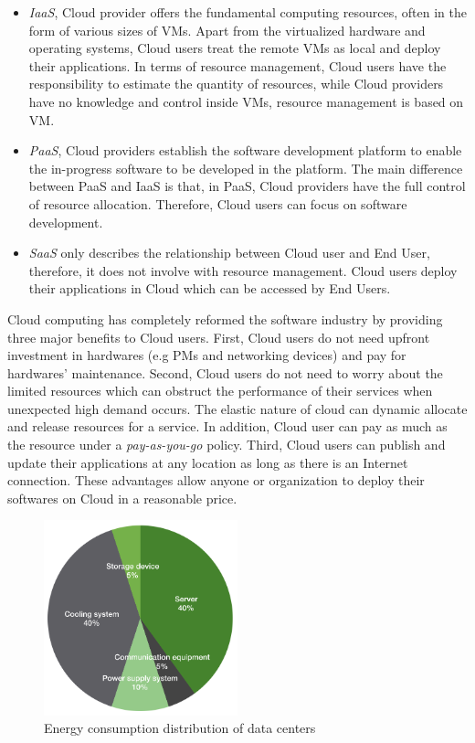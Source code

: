 \begin{itemize}
 	\item \emph{IaaS}, Cloud provider offers the fundamental computing resources, often in the form of various sizes of VMs. Apart from the virtualized hardware and operating systems, Cloud users treat the remote VMs as local and deploy their applications. In terms of resource management, Cloud users have the responsibility to estimate the quantity of resources, while Cloud providers have no knowledge and control inside VMs, resource management is based on VM. 
  	
  	\item \emph{PaaS}, Cloud providers establish the software development platform to enable the in-progress software to be developed in the platform.  The main difference between PaaS and IaaS is that, in PaaS, Cloud providers have the full control of resource allocation. Therefore, Cloud users can focus on software development.
  	
  	\item \emph{SaaS} only describes the relationship between Cloud user and End User, therefore, it does not involve with resource management. Cloud users deploy their applications in Cloud which can be accessed by End Users. 
\end{itemize}

Cloud computing has completely reformed the software industry \cite{Buyya:2009ix} by providing three major benefits to Cloud users.
First, Cloud users do not need upfront investment in hardwares (e.g PMs and networking devices) and pay for hardwares' maintenance. 
Second, Cloud users do not need to worry about the limited resources which can obstruct the performance of their services when unexpected high demand occurs. The elastic nature of cloud can dynamic allocate and release resources for a service. In addition, Cloud user can pay as much as the resource under a \emph{pay-as-you-go} policy.
Third, Cloud users can publish and update their applications at any location 
as long as there is an Internet connection. 
These advantages allow anyone or organization to deploy their softwares on Cloud in
a reasonable price. 

\begin{figure}
	\centering
	\includegraphics[width=0.5\textwidth]{pics/energyConsumption.png}
	\caption{Energy consumption distribution of data centers \cite{Rong:2016js}}
	\label{fig:consumption}
\end{figure} 

